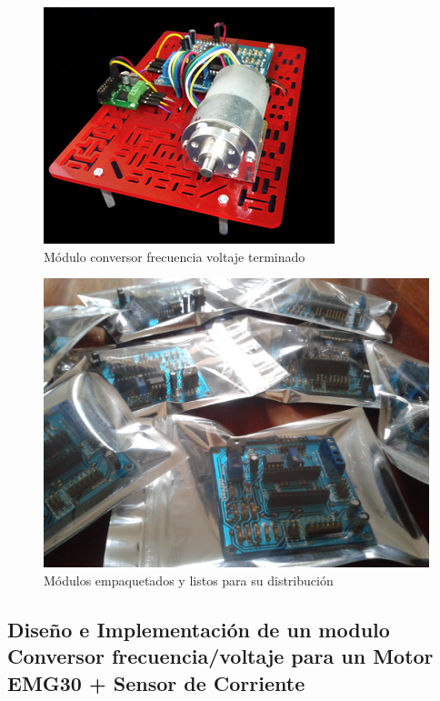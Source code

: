 \begin{figure}[h!]
  \centering
  \includegraphics[scale=0.8]{images/activities/motor_pololu/modulo-pololu.png}
  \caption{Módulo conversor frecuencia voltaje terminado}
  \label{fig:modulo-pololu}
\end{figure}

\begin{figure}[h!]
  \centering
  \includegraphics[scale=0.1]{images/activities/motor_pololu/empaquetado-pololu.jpg}
  \caption{Módulos empaquetados y listos para su distribución}
  \label{fig:empaquetado-pololu}
\end{figure}

\clearpage

\subsection{Diseño e Implementación de un modulo Conversor frecuencia/voltaje para un Motor EMG30 + Sensor de Corriente}

